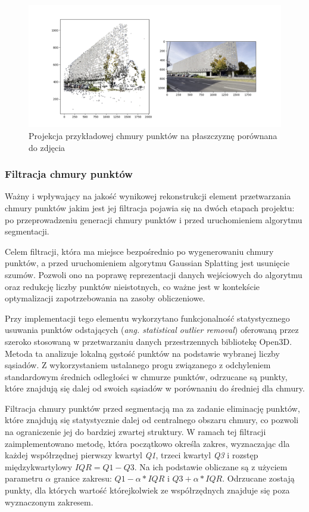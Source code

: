 \begin{figure}[!ht]
  \centering
  \includegraphics[width=0.9\linewidth]{img/sfm_projection.png}
  \caption{Projekcja przykładowej chmury punktów na płaszczyznę porównana do zdjęcia}
\end{figure}

\subsubsection{Filtracja chmury punktów}
Ważny i wpływający na jakość wynikowej rekonstrukcji element przetwarzania chmury punktów jakim jest jej filtracja pojawia się na dwóch etapach projektu: po przeprowadzeniu generacji chmury punktów i przed uruchomieniem algorytmu segmentacji. 

Celem filtracji, która ma miejsce bezpośrednio po wygenerowaniu chmury punktów, a przed uruchomieniem algorytmu Gaussian Splatting jest usunięcie szumów. Pozwoli ono na poprawę reprezentacji danych wejściowych do algorytmu oraz redukcję liczby punktów nieistotnych, co ważne jest w kontekście optymalizacji zapotrzebowania na zasoby obliczeniowe.

Przy implementacji tego elementu wykorzytano funkcjonalność statystycznego usuwania punktów odstających (\textit{ang. statistical outlier removal}) oferowaną przez szeroko stosowaną w przetwarzaniu danych przestrzennych bibliotekę Open3D. Metoda ta analizuje lokalną gęstość punktów na podstawie wybranej liczby sąsiadów. Z wykorzystaniem ustalanego progu związanego z odchyleniem standardowym średnich odległości w chmurze punktów, odrzucane są punkty, które znajdują się dalej od swoich sąsiadów w porównaniu do średniej dla chmury. 

Filtracja chmury punktów przed segmentacją ma za zadanie eliminację punktów, które znajdują się 
statystycznie dalej od centralnego obszaru chmury, co pozwoli na ograniczenie jej do bardziej zwartej struktury. W ramach tej filtracji zaimplementowano metodę, która początkowo określa zakres, wyznaczając dla każdej współrzędnej pierwszy kwartyl \textit{Q1}, trzeci kwartyl \textit{Q3} i rozstęp międzykwartylowy $IQR = Q1 - Q3$. Na ich podstawie obliczane są z użyciem parametru $\alpha$ granice zakresu: $Q1 - \alpha * IQR$ i $Q3 + \alpha * IQR$. Odrzucane zostają punkty, dla których wartość którejkolwiek ze współrzędnych znajduje się poza wyznaczonym zakresem.


